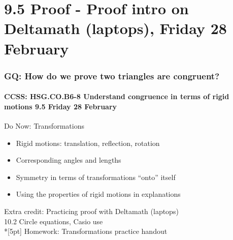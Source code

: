 \documentclass{beamer}
\begin{document}
\section{9.5 Proof - Proof intro on Deltamath (laptops), Friday 28 February}
\frame
{
  \frametitle{GQ: How do we prove two triangles are congruent?}
  \framesubtitle{CCSS: HSG.CO.B6-8 Understand congruence in terms of rigid motions \hfill \alert{9.5 Friday 28 February}}

  \begin{block}{Do Now: Transformations}
    \begin{itemize}
      \item Rigid motions: translation, reflection, rotation
      \item Corresponding angles and lengths
      \item Symmetry in terms of transformations ``onto'' itself
      \item Using the properties of rigid motions in explanations
    \end{itemize}
    \end{block}
    Extra credit: Practicing proof with Deltamath (laptops) \\
    10.2 Circle equations, Casio use\\*[5pt]
    Homework: Transformations practice handout
}
\end{document}
